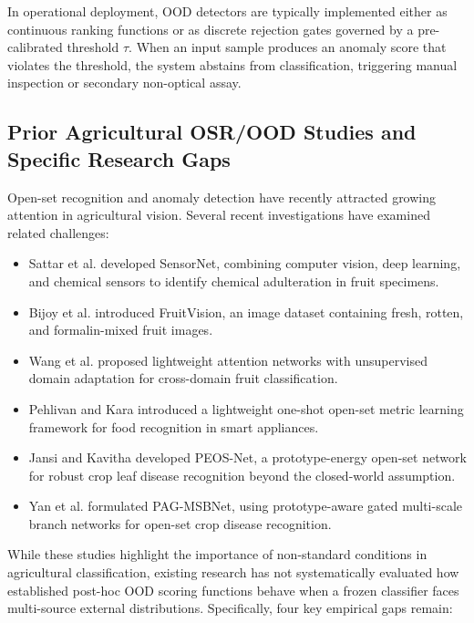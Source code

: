 In operational deployment, OOD detectors are typically implemented either as continuous ranking functions or as discrete rejection gates governed by a pre-calibrated threshold $\tau$. When an input sample produces an anomaly score that violates the threshold, the system abstains from classification, triggering manual inspection or secondary non-optical assay.

\subsection{Prior Agricultural OSR/OOD Studies and Specific Research Gaps}
\label{sec:prior_work_gaps}
Open-set recognition and anomaly detection have recently attracted growing attention in agricultural vision. Several recent investigations have examined related challenges:
\begin{itemize}
\item Sattar et al. \cite{sattar2024sensornet} developed SensorNet, combining computer vision, deep learning, and chemical sensors to identify chemical adulteration in fruit specimens.
\item Bijoy et al. \cite{bijoy2025fruitvision} introduced FruitVision, an image dataset containing fresh, rotten, and formalin-mixed fruit images.
\item Wang et al. \cite{wang2023crossdomain} proposed lightweight attention networks with unsupervised domain adaptation for cross-domain fruit classification.
\item Pehlivan and Kara \cite{pehlivan2026lightweight} introduced a lightweight one-shot open-set metric learning framework for food recognition in smart appliances.
\item Jansi and Kavitha \cite{jansi2026peos} developed PEOS-Net, a prototype-energy open-set network for robust crop leaf disease recognition beyond the closed-world assumption.
\item Yan et al. \cite{yan2026pagmsbnet} formulated PAG-MSBNet, using prototype-aware gated multi-scale branch networks for open-set crop disease recognition.
\end{itemize}

While these studies highlight the importance of non-standard conditions in agricultural classification, existing research has not systematically evaluated how established post-hoc OOD scoring functions behave when a frozen classifier faces multi-source external distributions. Specifically, four key empirical gaps remain:

